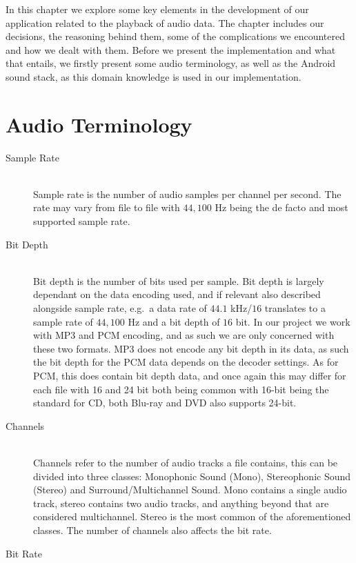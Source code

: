 In this chapter we explore some key elements in the development of our application related to the playback of audio data.
The chapter includes our decisions, the reasoning behind them, some of the complications we encountered and how we dealt with them.
Before we present the implementation and what that entails, we firstly present some audio terminology, as well as the Android sound stack, as this domain knowledge is used in our implementation.

\section{Audio Terminology}
\begin{description}
    \item [Sample Rate]\cite{sample_rate_std} \hfill \\
    Sample rate is the number of audio samples per channel per second.
    The rate may vary from file to file with $44,100$ Hz being the de facto and most supported sample rate.
    \item [Bit Depth]\cite{bit_depth} \hfill \\
    Bit depth is the number of bits used per sample.
    Bit depth is largely dependant on the data encoding used, and if relevant also described alongside sample rate, e.g.\ a data rate of $44.1$ kHz/$16$ translates to a sample rate of $44,100$ Hz and a bit depth of $16$ bit.
    In our project we work with MP3 and \ac{PCM} encoding, and as such we are only concerned with these two formats.
    MP3 does not encode any bit depth in its data, as such the bit depth for the \ac{PCM} data depends on the decoder settings.
    As for \ac{PCM}, this does contain bit depth data, and once again this may differ for each file with 16 and 24 bit both being common with 16-bit being the standard for CD, both Blu-ray and DVD also supports 24-bit.
    \item [Channels]\cite{channels} \hfill \\
    Channels refer to the number of audio tracks a file contains, this can be divided into three classes: Monophonic Sound (Mono), Stereophonic Sound (Stereo) and Surround/Multichannel Sound.
    Mono contains a single audio track, stereo contains two audio tracks, and anything beyond that are considered multichannel.
    Stereo is the most common of the aforementioned classes.
    The number of channels also affects the bit rate.
    \item [Bit Rate]\cite{bit_rate} \hfill \\

\end{description}
